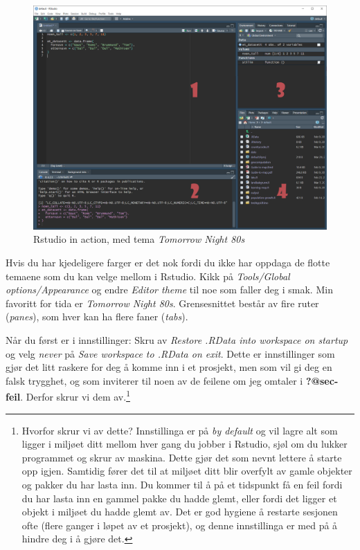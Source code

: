 \documentclass[
  letterpaper,
  DIV=11,
  numbers=noendperiod]{scrartcl}
\begin{document}
\begin{figure}

{\centering \includegraphics{img/rstudio_annotated.PNG}

}

\caption{Rstudio in action, med tema \emph{Tomorrow Night 80s}}

\end{figure}

Hvis du har kjedeligere farger er det nok fordi du ikke har oppdaga de
flotte temaene som du kan velge mellom i Rstudio. Kikk på
\emph{Tools/Global options/Appearance} og endre \emph{Editor theme} til
noe som faller deg i smak. Min favoritt for tida er \emph{Tomorrow Night
80s}. Grensesnittet består av fire ruter (\emph{panes}), som hver kan ha
flere faner (\emph{tabs}).

Når du først er i innstillinger: Skru av \emph{Restore .RData into
workspace on startup} og velg \emph{never} på \emph{Save workspace to
.RData on exit}. Dette er innstillinger som gjør det litt raskere for
deg å komme inn i et prosjekt, men som vil gi deg en falsk trygghet, og
som inviterer til noen av de feilene om jeg omtaler i
\textbf{?@sec-feil}. Derfor skrur vi dem av.\footnote{Hvorfor skrur vi
  av dette? Innstillinga er på \emph{by default} og vil lagre alt som
  ligger i miljøet ditt mellom hver gang du jobber i Rstudio, sjøl om du
  lukker programmet og skrur av maskina. Dette gjør det som nevnt
  lettere å starte opp igjen. Samtidig fører det til at miljøet ditt
  blir overfylt av gamle objekter og pakker du har lasta inn. Du kommer
  til å på et tidspunkt få en feil fordi du har lasta inn en gammel
  pakke du hadde glemt, eller fordi det ligger et objekt i miljøet du
  hadde glemt av. Det er god hygiene å restarte sesjonen ofte (flere
  ganger i løpet av et prosjekt), og denne innstillinga er med på å
  hindre deg i å gjøre det.}
\end{document}
